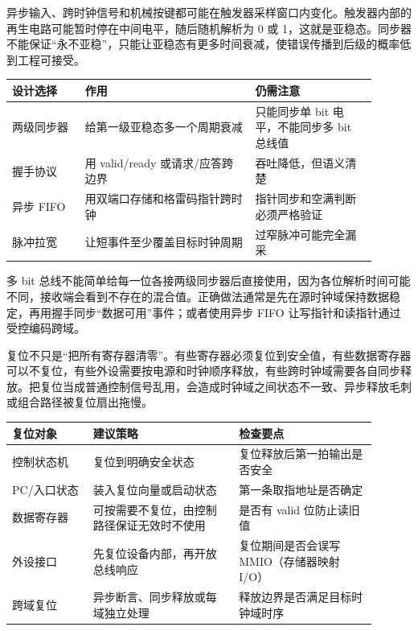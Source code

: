 异步输入、跨时钟信号和机械按键都可能在触发器采样窗口内变化。触发器内部的再生电路可能暂时停在中间电平，随后随机解析为 0 或 1，这就是亚稳态。同步器不能保证“永不亚稳”，只能让亚稳态有更多时间衰减，使错误传播到后级的概率低到工程可接受。

\begin{longtable}{L{0.18\linewidth}L{0.42\linewidth}L{0.3\linewidth}}
\toprule
设计选择 & 作用 & 仍需注意 \\
\midrule
两级同步器 & 给第一级亚稳态多一个周期衰减 & 只能同步单 bit 电平，不能同步多 bit 总线值 \\\tablerowrule
握手协议 & 用 valid/ready 或请求/应答跨边界 & 吞吐降低，但语义清楚 \\\tablerowrule
异步 FIFO & 用双端口存储和格雷码指针跨时钟 & 指针同步和空满判断必须严格验证 \\\tablerowrule
脉冲拉宽 & 让短事件至少覆盖目标时钟周期 & 过窄脉冲可能完全漏采 \\
\bottomrule
\end{longtable}

多 bit 总线不能简单给每一位各接两级同步器后直接使用，因为各位解析时间可能不同，接收端会看到不存在的混合值。正确做法通常是先在源时钟域保持数据稳定，再用握手同步“数据可用”事件；或者使用异步 FIFO 让写指针和读指针通过受控编码跨域。

复位不只是“把所有寄存器清零”。有些寄存器必须复位到安全值，有些数据寄存器可以不复位，有些外设需要按电源和时钟顺序释放，有些跨时钟域需要各自同步释放。把复位当成普通控制信号乱用，会造成时钟域之间状态不一致、异步释放毛刺或组合路径被复位扇出拖慢。

\begin{longtable}{L{0.2\linewidth}L{0.36\linewidth}L{0.34\linewidth}}
\toprule
复位对象 & 建议策略 & 检查要点 \\
\midrule
控制状态机 & 复位到明确安全状态 & 复位释放后第一拍输出是否安全 \\\tablerowrule
PC/入口状态 & 装入复位向量或启动状态 & 第一条取指地址是否确定 \\\tablerowrule
数据寄存器 & 可按需要不复位，由控制路径保证无效时不使用 & 是否有 valid 位防止读旧值 \\\tablerowrule
外设接口 & 先复位设备内部，再开放总线响应 & 复位期间是否会误写 MMIO（存储器映射 I/O） \\\tablerowrule
跨域复位 & 异步断言、同步释放或每域独立处理 & 释放边界是否满足目标时钟域时序 \\
\bottomrule
\end{longtable}


